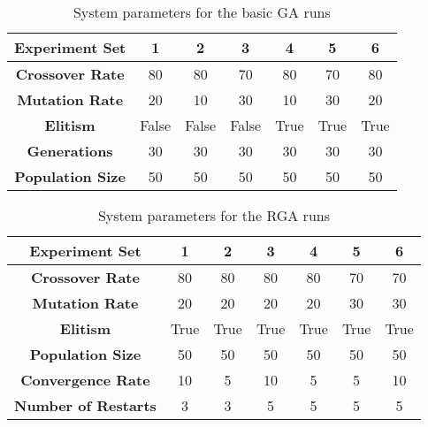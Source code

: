 \begin{table}
	\centering
	\begin{tabular}{ | >{\bfseries}c | c | c | c | c | c | c | }
		\hline
		Experiment Set & 1 & 2 & 3 & 4 & 5 & 6 \\ \hline
		Crossover Rate & 80 & 80 & 70 & 80 & 70 & 80 \\ \hline
		Mutation Rate & 20 & 10 & 30 & 10 & 30 & 20 \\ \hline
		Elitism & False & False & False & True & True & True \\ \hline
		Generations & 30 & 30 & 30 & 30 & 30 & 30 \\ \hline
		Population Size & 50 & 50 & 50 & 50 & 50 & 50 \\ \hline
	\end{tabular}
	\caption{System parameters for the basic GA runs}
	\label{table:viability-ga}
\end{table}

\begin{table}
	\centering
	\begin{tabular}{ | >{\bfseries}c | c | c | c | c | c | c | }
		\hline
		Experiment Set & 1 & 2 & 3 & 4 & 5 & 6 \\ \hline
		Crossover Rate & 80 & 80 & 80 & 80 & 70 & 70 \\ \hline
		Mutation Rate & 20 & 20 & 20 & 20 & 30 & 30 \\ \hline
		Elitism & True & True & True & True & True & True \\ \hline
		Population Size & 50 & 50 & 50 & 50 & 50 & 50 \\ \hline
		Convergence Rate & 10 & 5 & 10 & 5 & 5 & 10 \\ \hline
		Number of Restarts & 3 & 3 & 5 & 5 & 5 & 5 \\ \hline
	\end{tabular}
	\caption{System parameters for the RGA runs}
	\label{table:viability-rga}
\end{table}